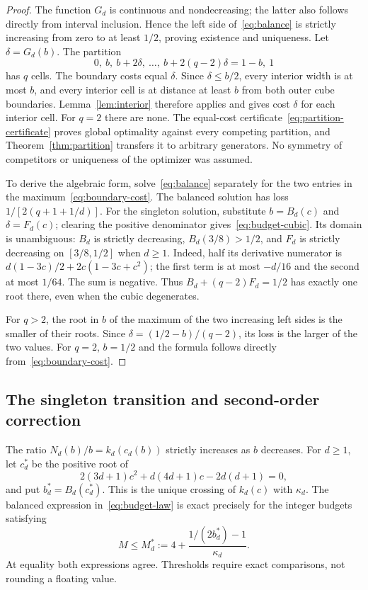 \begin{proof}
The function $G_d$ is continuous and nondecreasing; the latter also follows directly from interval inclusion. Hence the left side of~\eqref{eq:balance} is strictly increasing from zero to at least $1/2$, proving existence and uniqueness. Let $\delta=G_d(b)$. The partition
\[
0,\ b,\ b+2\delta,\ \ldots,\ b+2(q-2)\delta=1-b,\ 1
\]
has $q$ cells. The boundary costs equal $\delta$. Since $\delta\le b/2$, every interior width is at most $b$, and every interior cell is at distance at least $b$ from both outer cube boundaries. Lemma~\ref{lem:interior} therefore applies and gives cost $\delta$ for each interior cell. For $q=2$ there are none. The equal-cost certificate~\eqref{eq:partition-certificate} proves global optimality against every competing partition, and Theorem~\ref{thm:partition} transfers it to arbitrary generators. No symmetry of competitors or uniqueness of the optimizer was assumed.

To derive the algebraic form, solve~\eqref{eq:balance} separately for the two entries in the maximum~\eqref{eq:boundary-cost}. The balanced solution has loss $1/[2(q+1+1/d)]$. For the singleton solution, substitute $b=B_d(c)$ and $\delta=F_d(c)$; clearing the positive denominator gives~\eqref{eq:budget-cubic}. Its domain is unambiguous: $B_d$ is strictly decreasing, $B_d(3/8)>1/2$, and $F_d$ is strictly decreasing on $[3/8,1/2]$ when $d\ge1$. Indeed, half its derivative numerator is
$d(1-3c)/2+2c(1-3c+c^2)$; the first term is at most $-d/16$ and the second at most $1/64$. The sum is negative. Thus $B_d+(q-2)F_d=1/2$ has exactly one root there, even when the cubic degenerates.

For $q>2$, the root in $b$ of the maximum of the two increasing left sides is the smaller of their roots. Since $\delta=(1/2-b)/(q-2)$, its loss is the larger of the two values. For $q=2$, $b=1/2$ and the formula follows directly from~\eqref{eq:boundary-cost}.
\end{proof}

\subsection{The singleton transition and second-order correction}
The ratio $N_d(b)/b=k_d(c_d(b))$ strictly increases as $b$ decreases. For $d\ge1$, let $c_d^*$ be the positive root of
\begin{equation}\label{eq:transition}
2(3d+1)c^2+d(4d+1)c-2d(d+1)=0,
\end{equation}
and put $b_d^*=B_d(c_d^*)$. This is the unique crossing of $k_d(c)$ with $\kappa_d$. The balanced expression in~\eqref{eq:budget-law} is exact precisely for the integer budgets satisfying
\begin{equation}\label{eq:threshold}
M\le M_d^*:=4+\frac{1/(2b_d^*)-1}{\kappa_d}.
\end{equation}
At equality both expressions agree. Thresholds require exact comparisons, not rounding a floating value.

